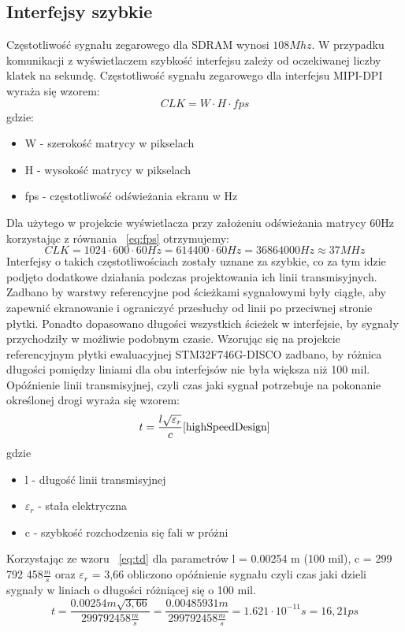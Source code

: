 \documentclass[eng,printmode]{mgr}
\begin{document}
\subsection*{Interfejsy szybkie}
Częstotliwość sygnału zegarowego dla SDRAM wynosi $108Mhz$. W przypadku komunikacji z wyświetlaczem szybkość interfejsu zależy od oczekiwanej liczby klatek na sekundę. Częstotliwość sygnału zegarowego dla interfejsu MIPI-DPI wyraża się wzorem:
\begin{equation}
CLK = W \cdot H \cdot fps \label{eq:fps}
\end{equation}
gdzie:
\begin{itemize}
  \item W - szerokość matrycy w pikselach
  \item H - wysokość matrycy w pikselach
  \item fps - częstotliwość odświeżania ekranu w Hz
\end{itemize}

Dla użytego w projekcie wyświetlacza przy założeniu odświeżania matrycy 60Hz korzystając z równania ~\ref{eq:fps} otrzymujemy:
$$
CLK = 1024 \cdot 600 \cdot 60Hz = 614400 \cdot 60Hz = 36864000 Hz \approx 37MHz
$$
Interfejsy o takich częstotliwościach zostały uznane za szybkie, co za tym idzie podjęto dodatkowe działania podczas projektowania ich linii transmisyjnych. Zadbano by warstwy referencyjne pod ścieżkami sygnałowymi były ciągłe, aby zapewnić ekranowanie i ograniczyć przesłuchy od linii po przeciwnej stronie płytki. Ponadto dopasowano długości wszystkich ścieżek w interfejsie, by sygnały przychodziły w możliwie podobnym czasie. Wzorując się na projekcie referencyjnym płytki ewaluacyjnej STM32F746G-DISCO zadbano, by różnica długości pomiędzy liniami dla obu interfejsów nie była większa niż 100 mil. Opóźnienie linii transmisyjnej, czyli czas jaki sygnał potrzebuje na pokonanie określonej drogi wyraża się wzorem:
\begin{equation}
t = \frac{l \sqrt{\varepsilon_r}}{c} \label{eq:td} \cite{highSpeedDesign}
\end{equation}
gdzie
\begin{itemize}
  \item l - długość linii transmisyjnej
  \item \textbf{$\varepsilon_r$} - stała elektryczna 
  \item c - szybkość rozchodzenia się fali w próżni
\end{itemize}
Korzystając ze wzoru ~\ref{eq:td} dla parametrów l = 0.00254 m (100 mil), c = 299 792 458$\frac{m}{s}$ oraz $\varepsilon_r$ = 3,66 obliczono opóźnienie sygnału czyli czas jaki dzieli sygnały w liniach o długości różniącej się o 100 mil.
$$
t = \frac{0.00254m \sqrt{3,66}}{299 792 458\frac{m}{s}} = \frac{0.00485931m}{299 792 458\frac{m}{s}} = 1.621\cdot10^{-11}s = 16,21 ps
$$
\end{document}
